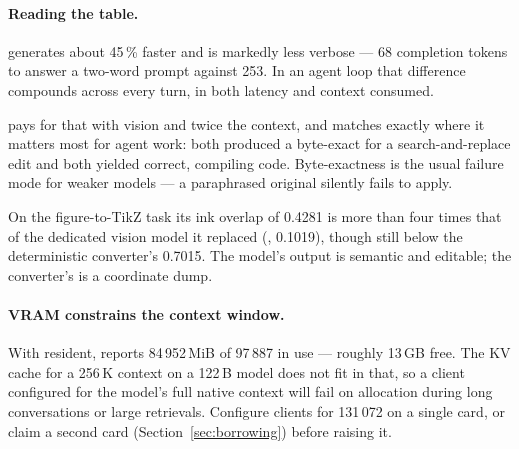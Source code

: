 \paragraph{Reading the table.}
 generates about 45\,\% faster and is markedly less verbose ---
68 completion tokens to answer a two-word prompt against 253. In an agent loop
that difference compounds across every turn, in both latency and context
consumed.

 pays for that with vision and twice the context, and
matches  exactly where it matters most for agent work: both
produced a byte-exact  for a search-and-replace edit and both
yielded correct, compiling code. Byte-exactness is the usual failure mode for
weaker models --- a paraphrased original silently fails to apply.

On the figure-to-TikZ task its ink overlap of 0.4281 is more than four times
that of the dedicated vision model it replaced (, 0.1019),
though still below the deterministic converter's 0.7015. The model's output is
semantic and editable; the converter's is a coordinate dump.

\paragraph{VRAM constrains the context window.}
With  resident,  reports 84\,952\,MiB of
97\,887 in use --- roughly 13\,GB free. The KV cache for a 256\,K context on a
122\,B model does not fit in that, so a client configured for the model's full
native context will fail on allocation during long conversations or large
retrievals. Configure clients for 131\,072 on a single card, or claim a second
card (Section~\ref{sec:borrowing}) before raising it.
